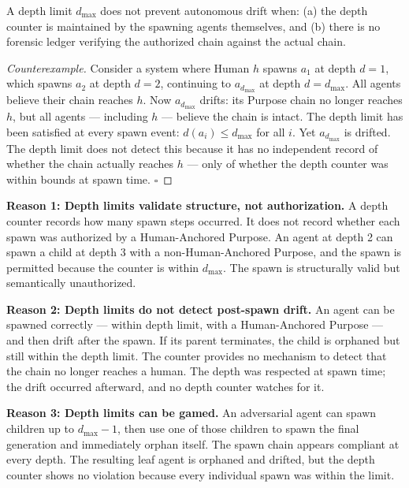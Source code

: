 \begin{thrm}
\label{thrm:depth-limit-inadequate}
A depth limit $d_{\max}$ does not prevent autonomous drift when: (a) the depth counter is maintained by the spawning agents themselves, and (b) there is no forensic ledger verifying the authorized chain against the actual chain.
\end{thrm}

\begin{proof}[Counterexample]
Consider a system where Human $h$ spawns $a_1$ at depth $d=1$, which spawns $a_2$ at depth $d=2$, continuing to $a_{d_{\max}}$ at depth $d=d_{\max}$. All agents believe their chain reaches $h$. Now $a_{d_{\max}}$ drifts: its Purpose chain no longer reaches $h$, but all agents — including $h$ — believe the chain is intact. The depth limit has been satisfied at every spawn event: $d(a_i) \leq d_{\max}$ for all $i$. Yet $a_{d_{\max}}$ is drifted. The depth limit does not detect this because it has no independent record of whether the chain actually reaches $h$ — only of whether the depth counter was within bounds at spawn time. $\square$
\end{proof}

\medskip
\noindent\textbf{Reason 1: Depth limits validate structure, not authorization.}
A depth counter records how many spawn steps occurred. It does not record whether each spawn was authorized by a Human-Anchored Purpose. An agent at depth 2 can spawn a child at depth 3 with a non-Human-Anchored Purpose, and the spawn is permitted because the counter is within $d_{\max}$. The spawn is structurally valid but semantically unauthorized.

\medskip
\noindent\textbf{Reason 2: Depth limits do not detect post-spawn drift.}
An agent can be spawned correctly — within depth limit, with a Human-Anchored Purpose — and then drift after the spawn. If its parent terminates, the child is orphaned but still within the depth limit. The counter provides no mechanism to detect that the chain no longer reaches a human. The depth was respected at spawn time; the drift occurred afterward, and no depth counter watches for it.

\medskip
\noindent\textbf{Reason 3: Depth limits can be gamed.}
An adversarial agent can spawn children up to $d_{\max} - 1$, then use one of those children to spawn the final generation and immediately orphan itself. The spawn chain appears compliant at every depth. The resulting leaf agent is orphaned and drifted, but the depth counter shows no violation because every individual spawn was within the limit.

